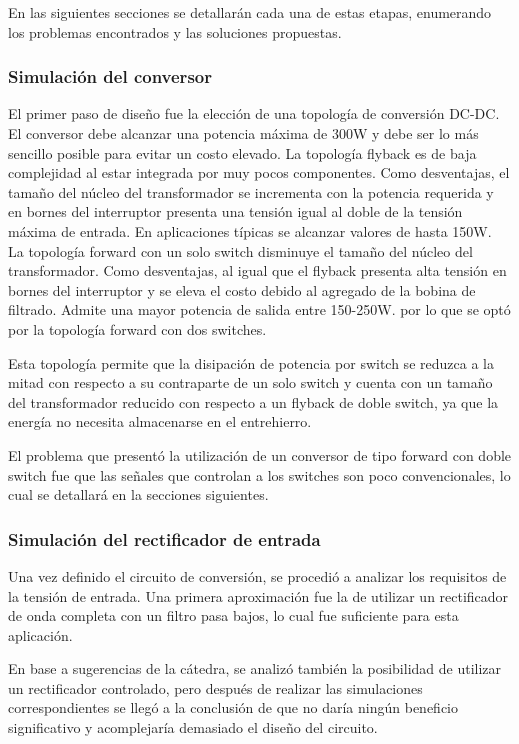 En las siguientes secciones se detallarán cada una de estas etapas,
enumerando los problemas encontrados y las soluciones propuestas.

\subsubsection{Simulación del conversor}
El primer paso de diseño fue la elección de una topología de conversión DC-DC.
El conversor debe alcanzar una potencia máxima de 300W y debe ser lo más sencillo posible para evitar un costo elevado. 
La topología flyback es de baja complejidad al estar integrada por muy pocos componentes. 
Como desventajas, el tamaño del núcleo del transformador se incrementa con la potencia requerida y en bornes del
interruptor presenta una tensión igual al doble de la tensión máxima de entrada. En aplicaciones típicas se alcanzar valores de hasta 150W.
La topología forward con un solo switch disminuye el tamaño del núcleo del transformador. 
Como desventajas, al igual que el flyback presenta alta tensión en bornes del interruptor y se eleva el costo debido al agregado de la bobina de filtrado.
Admite una mayor potencia de salida entre 150-250W.
por lo que se optó por la topología forward con dos switches. 

Esta topología permite que la disipación de potencia por switch se reduzca a la mitad con respecto a
su contraparte de un solo switch y cuenta con un tamaño del transformador reducido con respecto a
un flyback de doble switch, ya que la energía no necesita almacenarse en el entrehierro.

El problema que presentó la utilización de un conversor de tipo forward con doble switch fue que
las señales que controlan a los switches son poco convencionales, lo cual se detallará en la secciones siguientes.

\subsubsection{Simulación del rectificador de entrada}
Una vez definido el circuito de conversión, se procedió a analizar los requisitos de la tensión de entrada.
Una primera aproximación fue la de utilizar un rectificador de onda completa con un filtro pasa bajos,
lo cual fue suficiente para esta aplicación.

En base a sugerencias de la cátedra, se analizó también la posibilidad de utilizar un rectificador controlado,
pero después de realizar las simulaciones correspondientes se llegó a la conclusión de que no daría ningún beneficio
significativo y acomplejaría demasiado el diseño del circuito.

